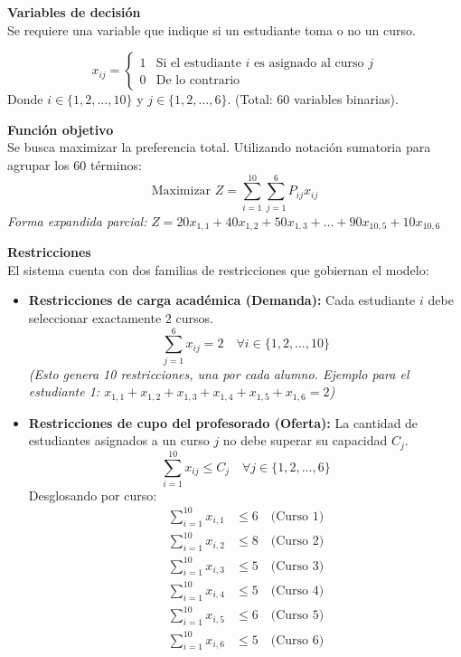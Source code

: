 \documentclass[10pt,a4paper]{article}
\begin{document}
\textbf{Variables de decisión}\\
Se requiere una variable que indique si un estudiante toma o no un curso.

\[ 
x_{ij} = 
\begin{cases} 
1 & \text{Si el estudiante } i \text{ es asignado al curso } j \\
0 & \text{De lo contrario}
\end{cases} 
\]
Donde $i \in \{1, 2, \dots, 10\}$ y $j \in \{1, 2, \dots, 6\}$. (Total: 60 variables binarias).

\vspace{3mm}

\textbf{Función objetivo}\\
Se busca maximizar la preferencia total. Utilizando notación sumatoria para agrupar los 60 términos:
\[ \text{Maximizar } Z = \sum_{i=1}^{10} \sum_{j=1}^{6} P_{ij} x_{ij} \]
\textit{Forma expandida parcial:} 
$Z = 20x_{1,1} + 40x_{1,2} + 50x_{1,3} + \dots + 90x_{10,5} + 10x_{10,6}$

\vspace{3mm}
\textbf{Restricciones}\\
El sistema cuenta con dos familias de restricciones que gobiernan el modelo:

\begin{itemize}
    \item \textbf{Restricciones de carga académica (Demanda):} Cada estudiante $i$ debe seleccionar exactamente 2 cursos. 
    \[ \sum_{j=1}^{6} x_{ij} = 2 \quad \forall i \in \{1, 2, \dots, 10\} \]
    \textit{(Esto genera 10 restricciones, una por cada alumno. Ejemplo para el estudiante 1: $x_{1,1} + x_{1,2} + x_{1,3} + x_{1,4} + x_{1,5} + x_{1,6} = 2$)}

    \item \textbf{Restricciones de cupo del profesorado (Oferta):} La cantidad de estudiantes asignados a un curso $j$ no debe superar su capacidad $C_j$.
    \[ \sum_{i=1}^{10} x_{ij} \le C_j \quad \forall j \in \{1, 2, \dots, 6\} \]
    Desglosando por curso:
    \begin{align*}
        \sum_{i=1}^{10} x_{i,1} &\le 6 \quad \text{(Curso 1)} \\
        \sum_{i=1}^{10} x_{i,2} &\le 8 \quad \text{(Curso 2)} \\
        \sum_{i=1}^{10} x_{i,3} &\le 5 \quad \text{(Curso 3)} \\
        \sum_{i=1}^{10} x_{i,4} &\le 5 \quad \text{(Curso 4)} \\
        \sum_{i=1}^{10} x_{i,5} &\le 6 \quad \text{(Curso 5)} \\
        \sum_{i=1}^{10} x_{i,6} &\le 5 \quad \text{(Curso 6)}
    \end{align*}
\end{itemize}
\end{document}
